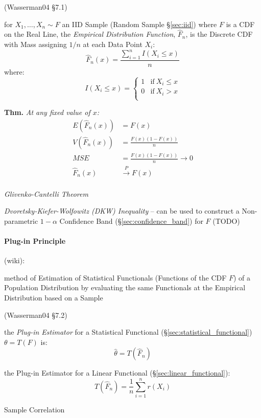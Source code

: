 (Wasserman04 \S7.1)

for $X_1, \ldots, X_n \sim F$ an IID Sample (Random Sample \S\ref{sec:iid})
where $F$ is a CDF on the Real Line, the \emph{Empirical Distribution Function},
$\hat{F}_n$, is the Discrete CDF with Mass assigning $1/n$ at each Data Point
$X_i$:
\[
  \hat{F}_n(x) = \frac{\sum_{i=1}^n I(X_i \leq x)}{n}
\]
where:
\[
  I(X_i \leq x) = \begin{cases}
    1 & \text{if}\ X_i \leq x \\
    0 & \text{if}\ X_i > x \\
  \end{cases}
\]

\textbf{Thm.} \emph{
  At any fixed value of $x$:
  \begin{align*}
    E(\hat{F}_n(x)) & = F(x)                     \\
    V(\hat{F}_n(x)) & = \frac{F(x)(1 - F(x))}{n} \\
    MSE & = \frac{F(x)(1-F(x))}{n} \to 0 \\
    \hat{F}_n(x) & \xrightarrow{P} F(x)          \\
  \end{align*}
}

\emph{Glivenko-Cantelli Theorem}

\emph{Dvoretsky-Kiefer-Wolfowitz (DKW) Inequality} -- can be used to construct a
Non-parametric $1-\alpha$ Confidence Band (\S\ref{sec:confidence_band}) for $F$
(TODO)



\paragraph{Plug-in Principle}\label{sec:plugin_principle}\hfill

(wiki):

method of Estimation of Statistical Functionals (Functions of the CDF $F$) of a
Population Distribution by evaluating the same Functionals at the Empirical
Distribution based on a Sample

(Wasserman04 \S7.2)

the \emph{Plug-in Estimator} for a Statistical Functional
(\S\ref{sec:statistical_functional}) $\theta = T(F)$ is:
\[
  \hat{\theta} = T(\hat{F}_n)
\]

the Plug-in Estimator for a Linear Functional (\S\ref{sec:linear_functional}):
\[
  T(\hat{F}_n) = \frac{1}{n}\sum_{i=1}^n r(X_i)
\]

Sample Correlation

